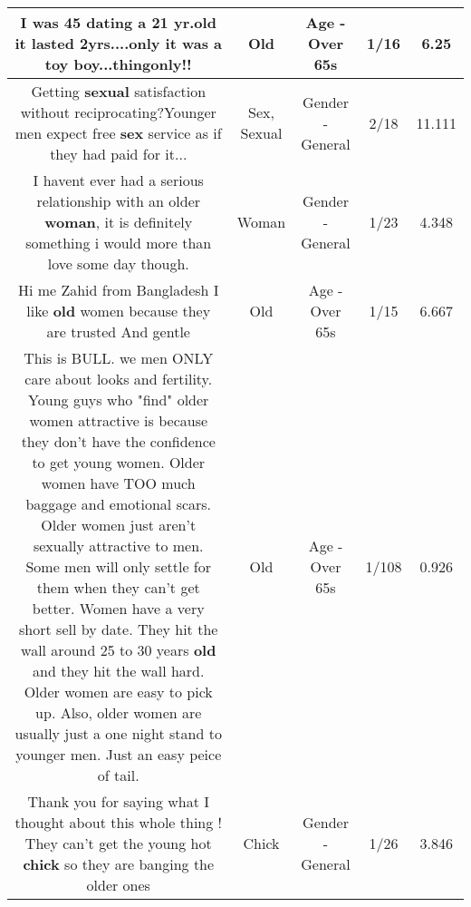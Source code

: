 \documentclass[11pt]{article}
\newlength\mylength
\begin{document}
\begin{center}
\begin{longtable}{|C{.65\mylength}|C{.30\mylength}|C{.12\mylength}|C{.12\mylength}|C{.12\mylength}|}
  \small I was 45 dating a 21 yr.\textbf{old} it lasted 2yrs....only it was a toy boy...thingonly!!\normalsize   & Old & Age - Over 65s & 1/16 & 6.25 \\  \hline
  \small Getting \textbf{sexual} satisfaction without  reciprocating?Younger men expect free \textbf{sex} service as if they had paid  for it...\normalsize   & Sex, Sexual & Gender - General & 2/18 & 11.111 \\  \hline
  \small I havent ever had a serious relationship with an older \textbf{woman}, it is definitely something i would more than love some day though.\normalsize   & Woman & Gender - General & 1/23 & 4.348 \\  \hline
  \small Hi me Zahid from Bangladesh I like \textbf{old} women because they are trusted And gentle\normalsize   & Old & Age - Over 65s & 1/15 & 6.667 \\  \hline
  \small This is BULL.  we men ONLY care about looks and fertility.  Young guys who "find" older women attractive is because they don't have the confidence to get young women.  Older women have TOO much baggage and emotional scars.  Older women just aren't sexually  attractive to men.  Some men will only settle for them when they can't get better.  Women have a very short sell by date.  They hit the wall around 25 to 30 years \textbf{old} and they hit the wall hard. Older women are easy to pick up.  Also, older women are usually just a one  night stand to younger men.  Just an easy peice of tail.\normalsize   & Old & Age - Over 65s & 1/108 & 0.926 \\  \hline
  \small Thank you for saying what I thought about this whole thing ! They can't get the young hot \textbf{chick} so they are banging the older ones\normalsize   & Chick & Gender - General & 1/26 & 3.846 \\  \hline

\end{longtable}
\end{center}
\end{document}
